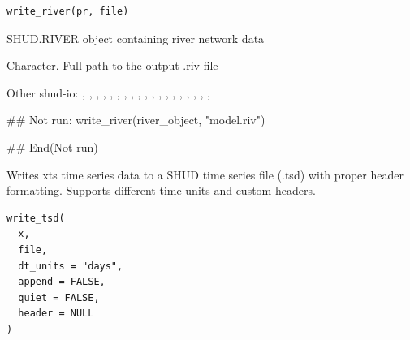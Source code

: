 \documentclass[a4paper]{book}
\begin{document}
%
\begin{Usage}
\begin{verbatim}
write_river(pr, file)
\end{verbatim}
\end{Usage}
%
\begin{Arguments}
\begin{ldescription}
\item[\code{pr}] SHUD.RIVER object containing river network data

\item[\code{file}] Character. Full path to the output .riv file
\end{ldescription}
\end{Arguments}
%
\begin{SeeAlso}\relax
Other shud-io: 
,
,
,
,
,
,
,
,
,
,
,
,
,
,
,
,
,
,
,
\end{SeeAlso}
%
\begin{Examples}
\begin{ExampleCode}
## Not run: 
write_river(river_object, "model.riv")

## End(Not run)
\end{ExampleCode}
\end{Examples}
%
\begin{Description}\relax
Writes xts time series data to a SHUD time series file (.tsd) with proper
header formatting. Supports different time units and custom headers.
\end{Description}
%
\begin{Usage}
\begin{verbatim}
write_tsd(
  x,
  file,
  dt_units = "days",
  append = FALSE,
  quiet = FALSE,
  header = NULL
)
\end{verbatim}
\end{Usage}
\end{document}

